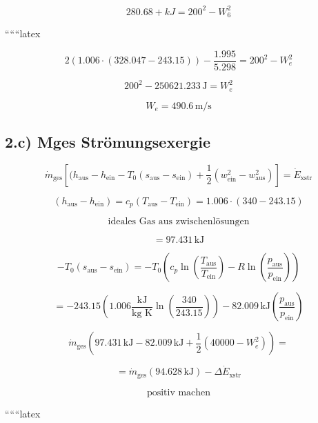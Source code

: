 \[
280.68 + kJ = 200^2 - W_6^2
\]

``````latex


\[
2 \left( 1.006 \cdot (328.047 - 243.15) \right) - \frac{1.995}{5.298} = 200^2 - W_{e}^2
\]

\[
200^2 - 250621.233 \, \text{J} = W_{e}^2
\]

\[
W_{e} = 490.6 \, \text{m/s}
\]

\subsection*{2.c) Mges Strömungsexergie}

\[
\dot{m}_{\text{ges}} \left[ (h_{\text{aus}} - h_{\text{ein}} - T_0 (s_{\text{aus}} - s_{\text{ein}}) + \frac{1}{2} (w_{\text{ein}}^2 - w_{\text{aus}}^2) \right] = \dot{E}_{\text{xstr}}
\]

\[
(h_{\text{aus}} - h_{\text{ein}}) = c_p (T_{\text{aus}} - T_{\text{ein}}) = 1.006 \cdot (340 - 243.15)
\]

\[
\text{ideales Gas aus zwischenlösungen}
\]

\[
= 97.431 \, \text{kJ}
\]

\[
- T_0 (s_{\text{aus}} - s_{\text{ein}}) = - T_0 \left( c_p \ln \left( \frac{T_{\text{aus}}}{T_{\text{ein}}} \right) - R \ln \left( \frac{p_{\text{aus}}}{p_{\text{ein}}} \right) \right)
\]

\[
= -243.15 \left( 1.006 \frac{\text{kJ}}{\text{kg K}} \ln \left( \frac{340}{243.15} \right) \right) - 82.009 \, \text{kJ} \left( \frac{p_{\text{aus}}}{p_{\text{ein}}} \right)
\]

\[
\dot{m}_{\text{ges}} \left( 97.431 \, \text{kJ} - 82.009 \, \text{kJ} + \frac{1}{2} \left( 40000 - W_{e}^2 \right) \right) =
\]

\[
= \dot{m}_{\text{ges}} \left( \boxed{94.628 \, \text{kJ}} \right) - \Delta \dot{E}_{\text{xstr}}
\]

\[
\text{positiv machen}
\]

``````latex


